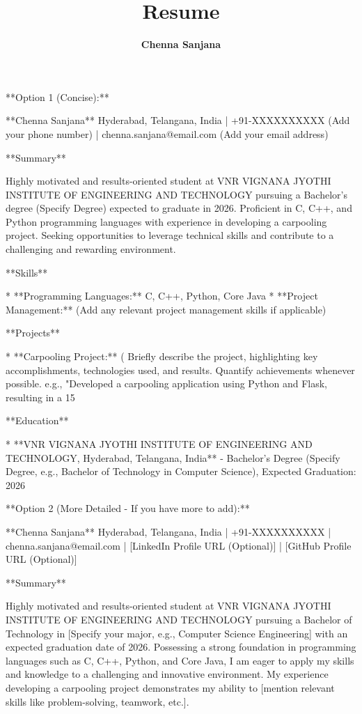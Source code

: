 \documentclass[a4paper, 12pt]{article}
\begin{document}
    \title{\textbf{Resume}}
    \author{\textbf{Chenna Sanjana}}
    \date{}
    \maketitle

    **Option 1 (Concise):**

**Chenna Sanjana**
Hyderabad, Telangana, India | +91-XXXXXXXXXX (Add your phone number) | chenna.sanjana@email.com (Add your email address)

**Summary**

Highly motivated and results-oriented student at VNR VIGNANA JYOTHI INSTITUTE OF ENGINEERING AND TECHNOLOGY pursuing a Bachelor's degree (Specify Degree) expected to graduate in 2026. Proficient in C, C++, and Python programming languages with experience in developing a carpooling project.  Seeking opportunities to leverage technical skills and contribute to a challenging and rewarding environment.


**Skills**

* **Programming Languages:** C, C++, Python, Core Java
* **Project Management:** (Add any relevant project management skills if applicable)


**Projects**

* **Carpooling Project:** ( Briefly describe the project, highlighting key accomplishments, technologies used, and results.  Quantify achievements whenever possible.  e.g., "Developed a carpooling application using Python and Flask, resulting in a 15%


**Education**

* **VNR VIGNANA JYOTHI INSTITUTE OF ENGINEERING AND TECHNOLOGY, Hyderabad, Telangana, India** - Bachelor's Degree (Specify Degree, e.g., Bachelor of Technology in Computer Science), Expected Graduation: 2026


**Option 2 (More Detailed - If you have more to add):**


**Chenna Sanjana**
Hyderabad, Telangana, India | +91-XXXXXXXXXX | chenna.sanjana@email.com | [LinkedIn Profile URL (Optional)] | [GitHub Profile URL (Optional)]

**Summary**

Highly motivated and results-oriented student at VNR VIGNANA JYOTHI INSTITUTE OF ENGINEERING AND TECHNOLOGY pursuing a Bachelor of Technology in [Specify your major, e.g., Computer Science Engineering] with an expected graduation date of 2026.  Possessing a strong foundation in programming languages such as C, C++, Python, and Core Java, I am eager to apply my skills and knowledge to a challenging and innovative environment.  My experience developing a carpooling project demonstrates my ability to [mention relevant skills like problem-solving, teamwork, etc.].
\end{document}
